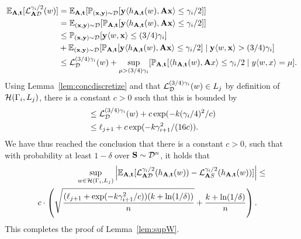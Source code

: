 \begin{align*}
\mathbb{E}_{\mathbf{A},\mathbf{t}}[\mathcal{L}^{\gamma_i/2}_{\mathbf{A} \mathcal{D}}(w)] &=\mathbb{E}_{\mathbf{A},\mathbf{t}}[\mathbb{P}_{(\mathbf{x},\mathbf{y})\sim \mathcal{D}}[\mathbf{y} \langle h_{\mathbf{A},\mathbf{t}}(w), \mathbf{A}\mathbf{x} \rangle \leq \gamma_i/2]] \\
&=
\mathbb{E}_{(\mathbf{x},\mathbf{y})\sim \mathcal{D}}[\mathbb{P}_{\mathbf{A},\mathbf{t}}[\mathbf{y} \langle h_{\mathbf{A},\mathbf{t}}(w), \mathbf{A}\mathbf{x} \rangle \leq \gamma_i/2]]
\\&\leq
\mathbb{P}_{(\mathbf{x},\mathbf{y})\sim \mathcal{D}}[\mathbf{y}\langle w, \mathbf{x} \rangle \leq (3/4)\gamma_{i}] \\
&+ \mathbb{E}_{(\mathbf{x},\mathbf{y})\sim \mathcal{D}}[\mathbb{P}_{\mathbf{A},\mathbf{t}}[\mathbf{y} \langle h_{\mathbf{A},\mathbf{t}}(w), \mathbf{A}\mathbf{x} \rangle \leq \gamma_i/2] \mid \mathbf{y}\langle w, \mathbf{x} \rangle > (3/4)\gamma_{i}] \\
&\leq \mathcal{L}_{\mathcal{D}}^{(3/4)\gamma_{i}}(w)  + \sup_{\mu > (3/4)\gamma_i}[\mathbb{P}_{\mathbf{A},\mathbf{t}}[\langle h_{\mathbf{A},\mathbf{t}}(w), \mathbf{A} x \rangle \leq \gamma_i/2 \mid y\langle w,x\rangle=\mu].
\end{align*}
Using Lemma~\ref{lem:concdiscretize} and that $\mathcal{L}^{(3/4)\gamma_i}_{\mathcal{D}}(w) \in L_j$ by definition of $\mathcal{H}(\Gamma_i,L_j)$, there is a constant $c>0$ such that this is bounded by
\begin{align*}
&\leq \mathcal{L}_{\mathcal{D}}^{(3/4)\gamma_{i}}(w) + c\exp(-k(\gamma_{i}/4)^2/c)\\
&\leq \ell_{j+1} + c \exp(-k \gamma_{i+1}^2/(16 c)).
\end{align*}
We have thus reached the conclusion that there is a constant $c>0$, such that with probability at least $1-\delta$ over $\mathbf{S} \sim \mathcal{D}^n$, it holds that
\begin{align*}
    \sup_{w \in \mathcal{H}(\Gamma_i,L_j)} \left|\mathbb{E}_{\mathbf{A},\mathbf{t}} [\mathcal{L}^{\gamma_i/2}_{\mathbf{A} \mathcal{D}}(h_{\mathbf{A},\mathbf{t}}(w)) - \mathcal{L}^{\gamma_i/2}_{\mathbf{A} S}(h_{\mathbf{A},\mathbf{t}}(w))]\right| &\leq\\ c \cdot \left(\sqrt{\frac{(\ell_{j+1} + \exp(-k \gamma_{i+1}^2/c)) (k + \ln(1/\delta))}{n}} + \frac{k + \ln(1/\delta)}{n} \right).
\end{align*}
This completes the proof of Lemma~\ref{lem:supW}.